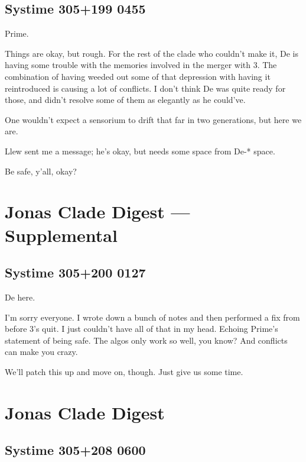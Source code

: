 \hypertarget{systime-305199-0455}{%
\subsection*{Systime 305+199 0455}\label{systime-305199-0455}}

Prime.

Things are okay, but rough. For the rest of the clade who couldn't make it, De is having some trouble with the memories involved in the merger with 3. The combination of having weeded out some of that depression with having it reintroduced is causing a lot of conflicts. I don't think De was quite ready for those, and didn't resolve some of them as elegantly as he could've.

One wouldn't expect a sensorium to drift that far in two generations, but here we are.

Llew sent me a message; he's okay, but needs some space from De-* space.

Be safe, y'all, okay?

\newpage
\hypertarget{jonas-clade-digest-supplemental-8}{%
\section*{Jonas Clade Digest --- Supplemental}\label{jonas-clade-digest-supplemental-8}}

\hypertarget{systime-305200-0127}{%
\subsection*{Systime 305+200 0127}\label{systime-305200-0127}}

De here.

I'm sorry everyone. I wrote down a bunch of notes and then performed a fix from before 3's quit. I just couldn't have all of that in my head. Echoing Prime's statement of being safe. The algos only work so well, you know? And conflicts can make you crazy.

We'll patch this up and move on, though. Just give us some time.

\newpage
\hypertarget{jonas-clade-digest-4}{%
\section*{Jonas Clade Digest}\label{jonas-clade-digest-4}}

\hypertarget{systime-305208-0600}{%
\subsection*{Systime 305+208 0600}\label{systime-305208-0600}}

